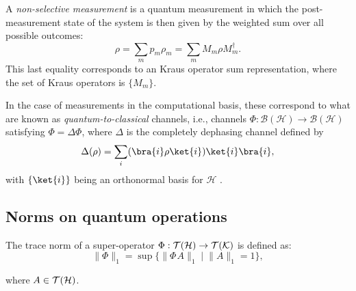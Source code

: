 \begin{definition}
A \emph{non-selective measurement} is a quantum measurement in which the post-measurement state of the system is then given by the weighted sum over all possible outcomes:
\[
\rho = \sum_m p_m \rho_m = \sum_m M_m \rho M_m^{\dag}.
\]
This last equality corresponds to an Kraus operator sum representation, where the set of Kraus operators is $\{M_{m}\}$.
\end{definition}

In the case of measurements in the computational basis, these correspond to what are known as \emph{quantum-to-classical} channels, i.e., channels $\Phi: \mathcal{B}(\mathcal{H}) \to \mathcal{B}(\mathcal{H})$ satisfying $\Phi = \Delta   \Phi$, where $\Delta$ is the completely dephasing channel defined by
\[
    \Delta(\rho) = \sum_i (\bra{i} \rho \ket{i})  \ket{i}\bra{i},
\]
with $\{\ket{i}\}$ being an orthonormal basis for $\mathcal{H}$ \cite[Proposition 2.36]{watrous2018theory}.

\subsection{Norms on quantum operations}
\begin{definition} \label{def:trace_norm_superoperator}
  The trace norm of a super-operator $\Phi: \mathcal{T}(\mathcal{H}) \rightarrow \mathcal{T}(\mathcal{K})$ is defined as:
  \begin{equation*} 
    \lVert \Phi \rVert_{1} =  \sup\{\lVert \Phi \hspace{1pt} A \rVert_{1}   \mid  \lVert A \rVert_{1}=1\}, 
  \end{equation*}
\end{definition}
where $A \in \mathcal{T}(\mathcal{H})$.




